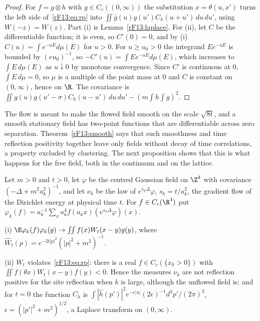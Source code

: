 \begin{proof}
For $f=g\otimes h$ with $g\in C_c((0,\infty))$ the substitution $x=\theta(u,x')$
turns the left side of~\eqref{rF13:eq:rp} into $\iint\bar g(u)g(u')C_h(u+u')
\,du\,du'$, using $W(-z)=W(z)$. Part (i) is Lemma~\ref{rF13:laplace}. For
(ii), let $C$ be the differentiable function; it is even, so $C'(0)=0$, and by
(i) $C(u)=\int e^{-uE}d\mu(E)$ for $u>0$. For $u\ge u_0>0$ the integrand
$Ee^{-uE}$ is bounded by $(eu_0)^{-1}$, so $-C'(u)=\int Ee^{-uE}d\mu(E)$, which
increases to $\int E\,d\mu(E)$ as $u\downarrow0$ by monotone convergence. Since
$C'$ is continuous at $0$, $\int E\,d\mu=0$, so $\mu$ is a multiple of the
point mass at $0$ and $C$ is constant on $(0,\infty)$, hence on $\R$. The
covariance is $\iint g(u)g(u'-\sigma)C_h(u-u')\,du\,du'-(m\int h\int g)^2$.
\end{proof}

The flow is meant to make the flowed field smooth on the scale $\sqrt{8t}$,
and a smooth stationary field has two-point functions that are
differentiable across zero separation. Theorem~\ref{rF13:smooth} says that
such smoothness and time reflection positivity together leave only fields
without decay of time correlations, a property excluded by clustering. The
next proposition shows that this is what happens for the free field, both in
the continuum and on the lattice.

\begin{proposition}\label{rF13:freeflow}
Let $m>0$ and $t>0$, let $\varphi$ be the centred Gaussian field on $\Z^4$
with covariance $(-\Delta+m^2a_k^2)^{-1}$, and let $\nu_k$ be the law of
$e^{s_k\Delta}\varphi$, $s_k=t/a_k^2$, the gradient flow of the Dirichlet
energy at physical time $t$. For $f\in C_c(\R^4)$ put $\varphi_k(f)=a_k^{-1}
\sum_xa_k^4f(a_kx)(e^{s_k\Delta}\varphi)(x)$.

\textup{(i)} $\E\varphi_k(f)\varphi_k(g)\to\iint f(x)W_t(x-y)g(y)$, where
$\hat W_t(p)=e^{-2t|p|^2}(|p|^2+m^2)^{-1}$.

\textup{(ii)} $W_t$ violates~\eqref{rF13:eq:rp}: there is a real $f\in
C_c(\{x_0>0\})$ with $\iint f(\theta x)W_t(x-y)f(y)<0$. Hence the measures
$\nu_k$ are not reflection positive for the site reflection when $k$ is
large, although the unflowed field is; and for $t=0$ the function $C_h$ is
$\int|\hat h(p')|^2e^{-\epsilon|u|}(2\epsilon)^{-1}d^3p'/(2\pi)^3$,
$\epsilon=(|p'|^2+m^2)^{1/2}$, a Laplace transform on $(0,\infty)$.
\end{proposition}

